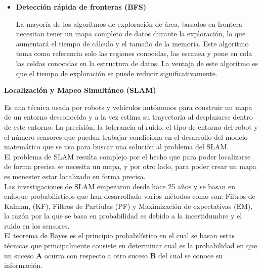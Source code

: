 \documentclass[12pt,a4paper]{article}
\begin{document}
\begin{itemize}
\item
\textbf{Detección rápida de fronteras (BFS)}

La mayoría de los algoritmos de exploración de área, basados en frontera necesitan tener un mapa completo de datos durante la exploración, lo que aumentará el tiempo de cálculo y el tamaño de la memoria.
Este algoritmo toma como referencia solo las regiones conocidas, las escanea y pone en cola las celdas conocidas en la estructura de datos. La ventaja de este algoritmo es que el tiempo de exploración se puede reducir significativamente.
\end{itemize}
\begin{center}
\textbf{Localización y Mapeo Simultáneo (SLAM)}
\end{center}
Es una técnica usada por robots y vehículos autónomos para construir un mapa de un entorno desconocido y a la vez estima su trayectoria al desplazarse dentro de este entorno.
La precisión, la tolerancia al ruido, el tipo de entorno del robot y el número sensores que puedan trabajar condiciona en el desarrollo del modelo matemático que se usa para buscar una solución al problema del SLAM.\\
El problema de SLAM resulta complejo por el hecho que para poder localizarse de forma precisa se necesita un mapa, y por otro lado, para poder crear un mapa es menester estar localizado en forma precisa.\\
Las investigaciones de SLAM empezaron desde hace 25 años y se basan en enfoque probabilisticos que han desarrollado varios métodos como son:
Filtros de Kalman, (KF), Filtros de Partiulas  (PF) y Maximización de expectativas (EM), la razón por la que se basa en probabilidad es debido a la incertidumbre y el ruido en los sensores. \\
El teorema de Bayes es el principio probabilístico en el cual se basan estas técnicas que principalmente consiste en determinar cual es la probabilidad en que un suceso \textbf{A} ocurra con respecto a otro suceso \textbf{B} del cual se conoce su información.
\end{document}
